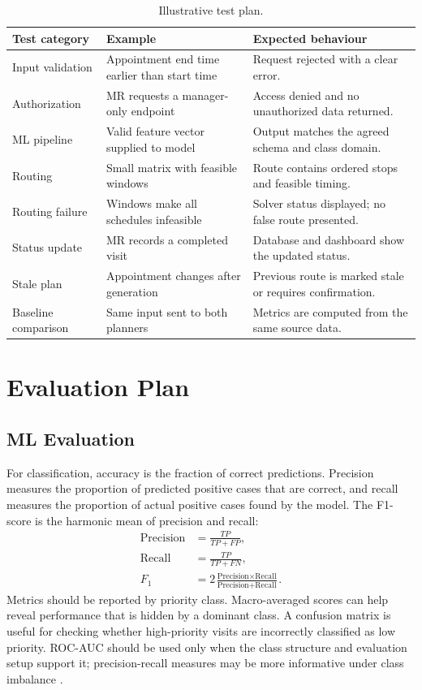\documentclass[12pt,a4paper,oneside]{report}
\begin{document}
\begin{table}[htbp]
\centering
\begin{tabularx}{\textwidth}{p{32mm}X X}
\toprule
\textbf{Test category} & \textbf{Example} & \textbf{Expected behaviour}\\
\midrule
Input validation & Appointment end time earlier than start time & Request rejected with a clear error.\\
Authorization & MR requests a manager-only endpoint & Access denied and no unauthorized data returned.\\
ML pipeline & Valid feature vector supplied to model & Output matches the agreed schema and class domain.\\
Routing & Small matrix with feasible windows & Route contains ordered stops and feasible timing.\\
Routing failure & Windows make all schedules infeasible & Solver status displayed; no false route presented.\\
Status update & MR records a completed visit & Database and dashboard show the updated status.\\
Stale plan & Appointment changes after generation & Previous route is marked stale or requires confirmation.\\
Baseline comparison & Same input sent to both planners & Metrics are computed from the same source data.\\
\bottomrule
\end{tabularx}
\caption{Illustrative test plan.}
\end{table}

\section{Evaluation Plan}
\subsection{ML Evaluation}
For classification, accuracy is the fraction of correct predictions. Precision measures the proportion of predicted positive cases that are correct, and recall measures the proportion of actual positive cases found by the model. The F1-score is the harmonic mean of precision and recall:
\begin{align}
\text{Precision} &= \frac{TP}{TP+FP},\\
\text{Recall} &= \frac{TP}{TP+FN},\\
F_1 &= 2\frac{\text{Precision}\times\text{Recall}}{\text{Precision}+\text{Recall}}.
\end{align}
Metrics should be reported by priority class. Macro-averaged scores can help reveal performance that is hidden by a dominant class. A confusion matrix is useful for checking whether high-priority visits are incorrectly classified as low priority. ROC-AUC should be used only when the class structure and evaluation setup support it; precision-recall measures may be more informative under class imbalance \cite{fawcett2006,davis2006,saito2015}.
\end{document}
